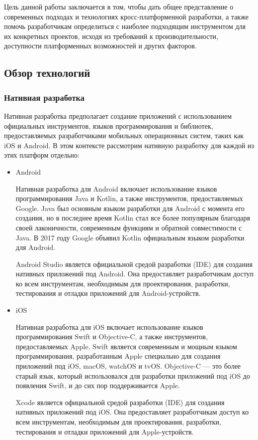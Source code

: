 \documentclass[14pt, russian]{scrartcl}
\begin{document}
Цель данной работы заключается в том, чтобы дать общее представление о современных подходах и технологиях кросс-платформенной разработки, а также помочь разработчикам определиться с наиболее подходящим инструментом для их конкретных проектов, исходя из требований к производительности, доступности платформенных возможностей и других факторов.

\subsection{Обзор технологий}

\subsubsection{Нативная разработка}

Нативная разработка предполагает создание приложений с использованием официальных инструментов, языков программирования и библиотек, предоставляемых разработчиками мобильных операционных систем, таких как iOS и Android. В этом контексте рассмотрим нативную разработку для каждой из этих платформ отдельно:

\begin{itemize}
    \item Android

    Нативная разработка для Android включает использование языков программирования Java и Kotlin, а также инструментов, предоставляемых Google. Java был основным языком разработки для Android с момента его создания, но в последнее время Kotlin стал все более популярным благодаря своей лаконичности, современным функциям и обратной совместимости с Java. В 2017 году Google объявил Kotlin официальным языком разработки для Android.

    Android Studio является официальной средой разработки (IDE) для создания нативных приложений под Android. Она предоставляет разработчикам доступ ко всем инструментам, необходимым для проектирования, разработки, тестирования и отладки приложений для Android-устройств.
    \item iOS

    Нативная разработка для iOS включает использование языков программирования Swift и Objective-C, а также инструментов, предоставляемых Apple. Swift является современным и мощным языком программирования, разработанным Apple специально для создания приложений под iOS, macOS, watchOS и tvOS. Objective-C --- это более старый язык, который использовался для разработки приложений под iOS до появления Swift, и до сих пор поддерживается Apple.

    Xcode является официальной средой разработки (IDE) для создания нативных приложений под iOS. Она предоставляет разработчикам доступ ко всем инструментам, необходимым для проектирования, разработки, тестирования и отладки приложений для Apple-устройств.
\end{itemize}
\end{document}
